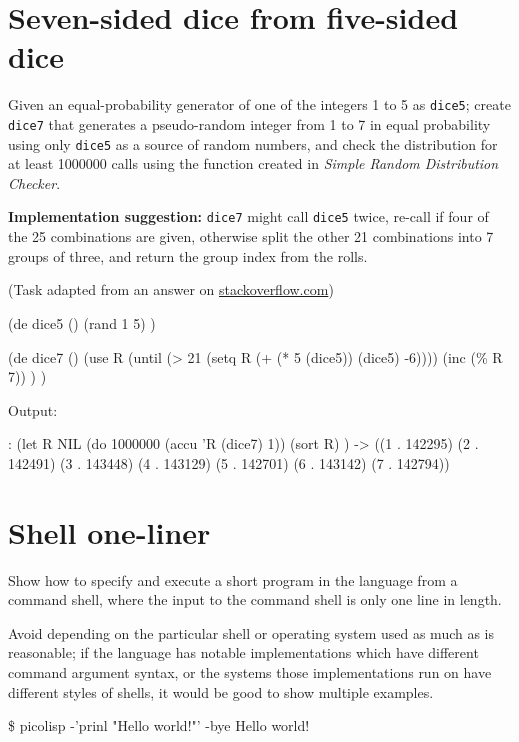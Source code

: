 \pagebreak{}
\section*{Seven-sided dice from five-sided dice}

Given an equal-probability generator of one of the integers 1 to 5 as
\texttt{dice5}; create \texttt{dice7} that generates a pseudo-random
integer from 1 to 7 in equal probability using only \texttt{dice5} as a
source of random numbers, and check the distribution for at least
1000000 calls using the function created in
\emph{Simple Random
Distribution Checker}.

\textbf{Implementation suggestion:} \texttt{dice7} might call
\texttt{dice5} twice, re-call if four of the 25 combinations are given,
otherwise split the other 21 combinations into 7 groups of three, and
return the group index from the rolls.

(Task adapted from an answer on
\href{http://stackoverflow.com/questions/90715/what-are-the-best-programming-puzzles-you-came-across}{stackoverflow.com})


\begin{wideverbatim}

(de dice5 ()
   (rand 1 5) )

(de dice7 ()
   (use R
      (until (> 21 (setq R (+ (* 5 (dice5)) (dice5) -6))))
      (inc (\% R 7)) ) )

Output:

: (let R NIL
   (do 1000000 (accu 'R (dice7) 1))
   (sort R) )
-> ((1 . 142295) (2 . 142491) (3 . 143448) (4 . 143129)
   (5 . 142701) (6 . 143142) (7 . 142794))

\end{wideverbatim}

\pagebreak{}
\section*{Shell one-liner}

Show how to specify and execute a short program in the language from a
command shell, where the input to the command shell is only one line in
length.

Avoid depending on the particular shell or operating system used as much
as is reasonable; if the language has notable implementations which have
different command argument syntax, or the systems those implementations
run on have different styles of shells, it would be good to show
multiple examples.

\begin{wideverbatim}

\$ picolisp -'prinl "Hello world!"' -bye
Hello world!

\end{wideverbatim}

